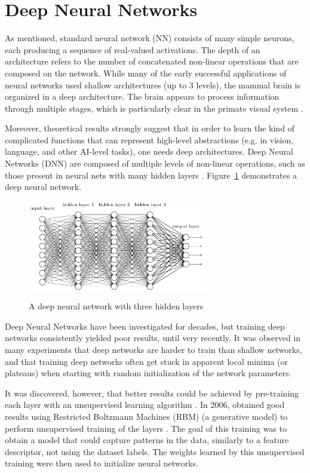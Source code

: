 \section{Deep Neural Networks}
\label{sec:deepcnn}
As mentioned, standard neural network (NN) consists of many simple neurons, each producing a sequence of real-valued activations. The depth of an architecture refers to the number of concatenated non-linear operations that are composed on the network. While many of the early successful applications of neural networks used shallow architectures (up to 3 levels), the mammal brain is organized in a deep architecture. The brain appears to process information through multiple stages, which is particularly clear in the primate visual system \cite{bengio2009learning}.

Moreover, theoretical results strongly suggest that in order to learn the kind of complicated functions that can represent high-level abstractions (e.g. in vision, language, and other AI-level tasks), one needs deep architectures. Deep Neural Networks (DNN) are composed of multiple levels of non-linear operations, such as those present in neural nets with many hidden layers \cite{bengio2009learning}. Figure~\ref{fig:deepl} demonstrates a deep neural network. 

\begin{figure}[H]
	\centering
	{\includegraphics[width=0.7\textwidth]{images/deepnn}}
	\caption{A deep neural network with three hidden layers}
	\label{fig:deepl}
\end{figure}

Deep Neural Networks have been investigated for decades, but training deep networks consistently yielded poor results, until very recently. It was observed in many experiments that deep networks are harder to train than shallow networks, and that training deep networks often get stuck in apparent local minima (or plateaus) when starting with random initialization of the network parameters.

It was discovered, however, that better results could be achieved by pre-training each layer with an unsupervised learning algorithm \cite{hinton2006fast}. In 2006, \citeauthor{hinton2006fast} obtained good results using Restricted Boltzmann Machines (RBM) (a generative model) to perform unsupervised training of the layers \cite{hinton2006fast}. The goal of this training was to obtain a model that could capture patterns in the data, similarly to a feature descriptor, not using the dataset labels. The weights learned by this unsupervised training were then used to initialize neural networks. 

